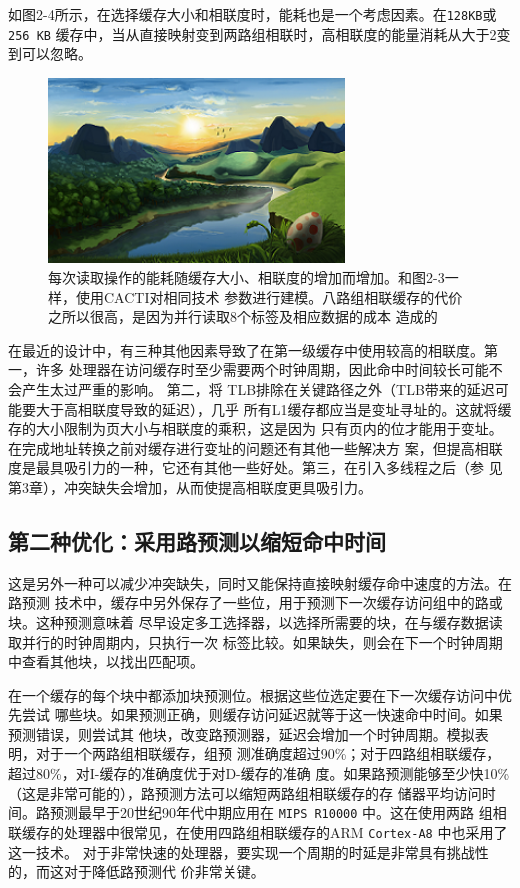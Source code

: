 如图2-4所示，在选择缓存大小和相联度时，能耗也是一个考虑因素。在\verb|128KB|或\verb|256 KB|
缓存中，当从直接映射变到两路组相联时，高相联度的能量消耗从大于2变到可以忽略。

\begin{figure}[!htb]
    \centering
	\includegraphics[width=0.7\textwidth]{imgs/sam.png}
	\caption{每次读取操作的能耗随缓存大小、相联度的增加而增加。和图2-3一样，使用CACTI对相同技术
            参数进行建模。八路组相联缓存的代价之所以很高，是因为并行读取8个标签及相应数据的成本
            造成的}
\end{figure}

在最近的设计中，有三种其他因素导致了在第一级缓存中使用较高的相联度。第一，许多
处理器在访问缓存时至少需要两个时钟周期，因此命中时间较长可能不会产生太过严重的影响。
第二，将 TLB排除在关键路径之外（TLB带来的延迟可能要大于高相联度导致的延迟），几乎
所有L1缓存都应当是变址寻址的。这就将缓存的大小限制为页大小与相联度的乘积，这是因为
只有页内的位才能用于变址。在完成地址转换之前对缓存进行变址的问题还有其他一些解决方
案，但提高相联度是最具吸引力的一种，它还有其他一些好处。第三，在引入多线程之后（参
见第3章），冲突缺失会增加，从而使提高相联度更具吸引力。

\subsection{第二种优化：采用路预测以缩短命中时间}

这是另外一种可以减少冲突缺失，同时又能保持直接映射缓存命中速度的方法。在路预测
技术中，缓存中另外保存了一些位，用于预测下一次缓存访问组中的路或块。这种预测意味着
尽早设定多工选择器，以选择所需要的块，在与缓存数据读取并行的时钟周期内，只执行一次
标签比较。如果缺失，则会在下一个时钟周期中查看其他块，以找出匹配项。

在一个缓存的每个块中都添加块预测位。根据这些位选定要在下一次缓存访问中优先尝试
哪些块。如果预测正确，则缓存访问延迟就等于这一快速命中时间。如果预测错误，则尝试其
他块，改变路预测器，延迟会增加一个时钟周期。模拟表明，对于一个两路组相联缓存，组预
测准确度超过90\%；对于四路组相联缓存，超过80\%，对I-缓存的准确度优于对D-缓存的准确
度。如果路预测能够至少快10\%（这是非常可能的），路预测方法可以缩短两路组相联缓存的存
储器平均访问时间。路预测最早于20世纪90年代中期应用在 \verb|MIPS R10000| 中。这在使用两路
组相联缓存的处理器中很常见，在使用四路组相联缓存的ARM \verb|Cortex-A8| 中也采用了这一技术。
对于非常快速的处理器，要实现一个周期的时延是非常具有挑战性的，而这对于降低路预测代
价非常关键。

